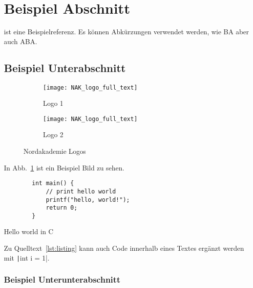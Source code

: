 \section{Beispiel Abschnitt}
\parencite{latex_companion} ist eine Beispielreferenz.
Es können Abkürzungen verwendet werden, wie \ac{BA} aber auch \ac{ABA}.

\subsection{Beispiel Unterabschnitt}

\begin{figure}[h]
    \centering

    \begin{subfigure}{.4\textwidth}
        \centering
        \texttt{[image: NAK\_logo\_full\_text]}
        \caption{Logo 1}
        \label{fig:subfig1}
    \end{subfigure}
    \begin{subfigure}{.4\textwidth}
        \centering
        \texttt{[image: NAK\_logo\_full\_text]}
        \caption{Logo 2}
        \label{fig:subfig2}
    \end{subfigure}

    \caption{Nordakademie Logos}
    \label{fig:fig}
\end{figure}

In Abb.~\ref{fig:subfig1} ist ein Beispiel Bild zu sehen.

\begin{listing}[H]
    \begin{verbatim}
        int main() {
            // print hello world
            printf("hello, world!");
            return 0;
        }
    \end{verbatim}
    \caption{Hello world in C}
    \label{lst:listing}
\end{listing}

Zu Quelltext~\ref{lst:listing} kann auch Code innerhalb eines Textes ergänzt werden mit \texttt|int i = 1|.

\subsubsection{Beispiel Unterunterabschnitt}

\Blindtext{}
